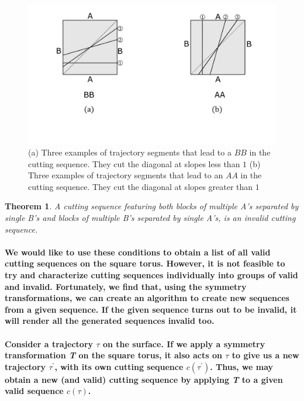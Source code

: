 \documentclass{report}
\newtheorem{theorem}{Theorem}[chapter]
\begin{document}
\begin{figure}[h] 
\begin{center}
\includegraphics[scale=0.3]{2.9}
\caption{(a) Three examples of trajectory segments that lead to a $BB$ in the cutting sequence. They cut the diagonal at slopes less than $1$ (b) Three examples of trajectory segments that lead to an $AA$ in the cutting sequence. They cut the diagonal at slopes greater than $1$}
\end{center}
\end{figure}

\begin{theorem}
A cutting sequence featuring both blocks of multiple A’s separated by single B’s and blocks of multiple B’s separated by single A’s, is an invalid cutting sequence.
\end{theorem}

\paragraph{We would like to use these conditions to obtain a list of all valid cutting sequences on the square torus. However, it is not feasible to try and characterize cutting sequences individually into groups of valid and invalid. Fortunately, we find that, using the symmetry transformations, we can create an algorithm to create new sequences from a given sequence. If the given sequence turns out to be invalid, it will render all the generated sequences invalid too.}

\paragraph{Consider a trajectory $\tau$ on the surface. If we apply a symmetry transformation \textit{T} on the square torus, it also acts on $\tau$ to give us a new trajectory $\tau^{'}$, with its own cutting sequence $c(\tau^{'})$. Thus, we may obtain a new (and valid) cutting sequence by applying \textit{T} to a given valid sequence  $c(\tau)$.}
\end{document}

